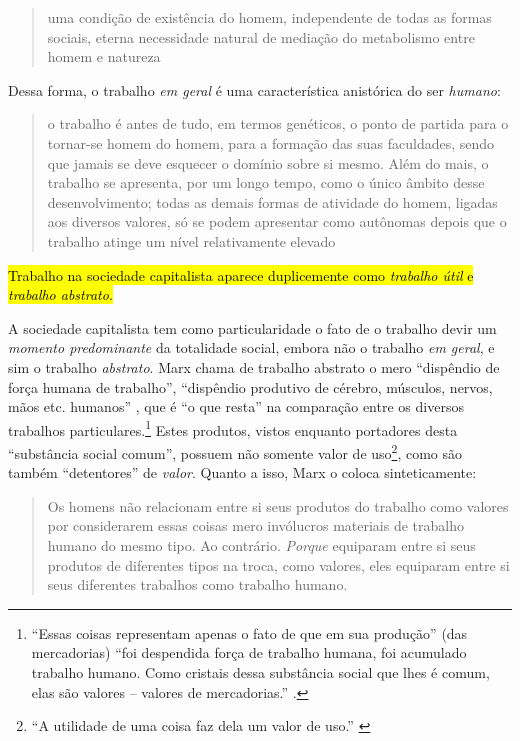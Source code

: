 \begin{quote}
uma condição de existência do homem, independente de todas as formas sociais, eterna necessidade natural de mediação do metabolismo entre homem e natureza \parencite[p. 120]{Marx2017}
\end{quote}

Dessa forma, o trabalho \emph{em geral} é uma característica anistórica do ser \emph{humano}:

\begin{quote}
o trabalho é antes de tudo, em termos genéticos, o ponto de partida para o tornar-se homem do homem, para a formação das suas faculdades, sendo que jamais se deve esquecer o domínio sobre si mesmo. Além do mais, o trabalho se apresenta, por um longo tempo, como o único âmbito desse desenvolvimento; todas as demais formas de atividade do homem, ligadas aos diversos valores, só se podem apresentar como autônomas depois que o trabalho atinge um nível relativamente elevado \parencite[p. 348]{Lukacs2012}
\end{quote}

\hl{Trabalho na sociedade capitalista aparece duplicemente como \textit{trabalho útil} e \textit{trabalho abstrato}.}

A sociedade capitalista tem como particularidade o fato de o trabalho devir um \emph{momento predominante} da totalidade social, embora não o trabalho \emph{em geral}, e sim o trabalho \emph{abstrato}. Marx chama de trabalho abstrato o mero ``dispêndio de força humana de trabalho'', ``dispêndio produtivo de cérebro, músculos, nervos, mãos etc. humanos'' \parencite[p. 121]{Marx2017}, que é ``o que resta'' na comparação entre os diversos trabalhos particulares.\footnote{``Essas coisas representam apenas o fato de que em sua produção'' (das mercadorias) ``foi despendida força de trabalho humana, foi acumulado trabalho humano. Como cristais dessa substância social que lhes é comum, elas são valores -- valores de mercadorias.'' \parencite[p. 116]{Marx2017}.} Estes produtos, vistos enquanto portadores desta ``substância social comum'', possuem não somente valor de uso\footnote{``A utilidade de uma coisa faz dela um valor de uso.'' \parencite[p. 114]{Marx2017}}, como são também ``detentores'' de \emph{valor}. Quanto a isso, Marx o coloca sinteticamente:

\begin{quote}
Os homens não relacionam entre si seus produtos do trabalho como valores por considerarem essas coisas mero invólucros materiais de trabalho humano do mesmo tipo. Ao contrário. \emph{Porque} equiparam entre si seus produtos de diferentes tipos na troca, como valores, eles equiparam entre si seus diferentes trabalhos como trabalho humano. \parencite[p. 149, grifo meu]{Marx2017}
\end{quote}

